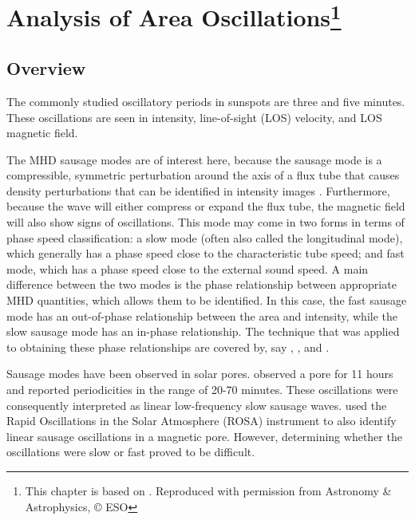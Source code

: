 \graphicspath{{Chapter3/Figs/}}
\nobibliography*

\chapter[Analysis of Area Oscillations]{Analysis of Area Oscillations\footnote{This chapter is based on . Reproduced with permission from Astronomy \& Astrophysics, © ESO}}
\label{chapter3}

   \vspace*{\fill}\par
   \pagebreak

\section{Overview}

	The commonly studied oscillatory periods in sunspots are three and five minutes.
	These oscillations are seen in intensity, line-of-sight (LOS) velocity, and LOS magnetic field.

	The MHD sausage modes are of interest here, because the sausage mode is a compressible, symmetric perturbation around the axis of a flux tube that causes density perturbations that can be identified in intensity images \citep{PMHDW}.
	Furthermore, because the wave will either compress or expand the flux tube, the magnetic field will also show signs of oscillations.
	This mode may come in two forms in terms of phase speed classification: a slow mode (often also called the longitudinal mode), which generally has a phase speed close to the characteristic tube speed; and fast mode, which has a phase speed close to the external sound speed.
	A main difference between the two modes is the phase relationship between appropriate MHD quantities, which allows them to be identified.
	In this case, the fast sausage mode has an out-of-phase relationship between the area and intensity, while the slow sausage mode has an in-phase relationship.
	The technique that was applied to obtaining these phase relationships are covered by, say \cite{PMHDW}, \cite{Moreels2013}, and \cite{Moreels2013b}.

	Sausage modes have been observed in solar pores.
	\citet{doretala2008} observed a pore for 11 hours and reported periodicities in the range of 20-70 minutes.
	These oscillations were consequently interpreted as linear low-frequency slow sausage waves.
	\citet{morton2011} used the Rapid Oscillations in the Solar Atmosphere (ROSA) instrument to also identify linear sausage oscillations in a magnetic pore.
	However, determining whether the oscillations were slow or fast proved to be difficult.

